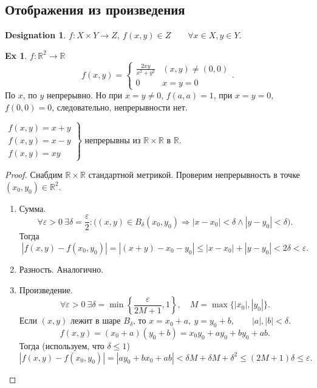 \documentclass[11pt]{book}
\newcommand{\R}{\mathbb{R}}
\renewcommand{\le}{\leqslant}
\theoremstyle{definition}
\theoremstyle{plain}
\theoremstyle{plain}
\theoremstyle{definition}
\newtheorem*{ex}{Ex}
\newtheorem*{name}{Designation}
\theoremstyle{remark}
\begin{document}
\subsection{Отображения из произведения}
\begin{name}
    $ f: X \times Y \to  Z, ~ f(x, y) \in Z \qquad \forall  x \in X, y \in Y$.
\end{name}
\begin{ex}
    $ f: \R^2 \to  \R$
\[
    f(x, y) = 
    \begin{cases}
	\frac{2xy}{x^2+y^2} & (x, y) \ne (0, 0)\\
	0 & x=y=0
    \end{cases}
.\] 
По $ x$, по $ y$ непрерывно. Но при $ x=y\ne 0$,  $ f(a, a) = 1$, при $ x=y=0$,  $ f(0, 0) = 0$, следовательно, непрерывности нет.
\end{ex}
\begin{thm}
    $
    \left.
    \begin{array}{l}
	f(x, y) = x+y \\
	f(x, y) = x - y \\
	f(x, y) = xy
    \end{array}
\right\}
    $ непрерывны из $ \R \times \R$ в $ \R$.
\end{thm}
\begin{proof}
    Снабдим $ \R \times \R$ стандартной метрикой.
    Проверим непрерывность в точке $ (x_0, y_0) \in \R^2$.
    \begin{enumerate}
        \item Сумма.
	    \[
		\forall \varepsilon >0 ~ \exists \delta = \frac{\varepsilon}{2}: \bigl( (x, y) \in B_{\delta}(x_0, y_0) \Longrightarrow |x-x_0| < \delta \wedge |y-y_0|<\delta \bigr)
	    .\] 
	    Тогда 
	     \[
		 |f(x, y) - f(x_0, y_0)| = |(x+ y) - x_0 - y_0| \le |x - x_0| + |y - y_0| < 2\delta < \varepsilon 
	    .\] 
	\item Разность. Аналогично.
	\item Произведение.
	    \[
	    \forall  \varepsilon >0 ~\exists \delta = \min \left\{ \frac{\varepsilon}{2M + 1}, 1 \right\}, \quad M = \max \{|x_0|, |y_0|\} 
	    .\] 
	    Если $ (x, y)$ лежит в шаре  $ B_{\delta}$, то $ x = x_0 + a, ~ y = y_0+b, \qquad |a|, |b| < \delta$.
	    \[
		f(x, y) = (x_0+a)(y_0+b) = x_0y_0+ay_0+by_0+ab
	    .\] 
	    Тогда  (используем, что $ \delta \le 1$)
	    \[
		|f(x, y) - f(x_0, y_0)| = |ay_0+bx_0+ab|<\delta M + \delta M + \delta^2 \le (2M+1) \delta \le \varepsilon 
	    .\] 
    \end{enumerate}
\end{proof}
\end{document}
